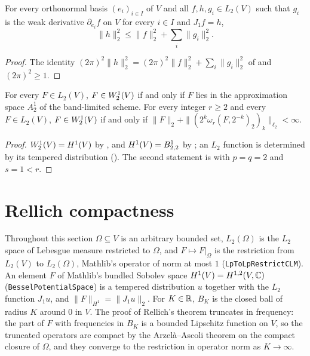 \begin{corollary}
\label{cor:weak-gradient-sobolev-norm}
\leanok
{}
For every orthonormal basis $(e_i)_{i \in I}$ of $V$ and all $f, h, g_i \in L_2(V)$ such that
$g_i$ is the weak derivative $\partial_{e_i} f$ on $V$ for every $i \in I$ and $J_1 f = h$,
\[
  \|h\|_2^2 \leq \|f\|_2^2 + \sum_i \|g_i\|_2^2 .
\]
\end{corollary}

\begin{proof}
\leanok
The identity $(2\pi)^2 \|h\|_2^2 = (2\pi)^2 \|f\|_2^2 + \sum_i \|g_i\|_2^2$ of
 and $(2\pi)^2 \geq 1$.
\end{proof}

\begin{theorem}[$\Sob{1}{2} = \Besov{1}{2}{2}$]
\label{thm:sobolev-one-two-besov}
\leanok
{}
For every $F \in L_2(V)$, $F \in W^{1}_{2}(V)$ if and only if $F$ lies in the approximation space
$A^1_2$ of the band-limited scheme. For every integer $r \geq 2$ and every $F \in L_2(V)$,
$F \in W^{1}_{2}(V)$ if and only if
$\|F\|_2 + \|(2^k \omega_r(F, 2^{-k})_2)_k\|_{\ell_2} < \infty$.
\end{theorem}

\begin{proof}
\leanok
$W^{1}_{2}(V) = H^1(V)$ by , and $H^1(V) = B^{1}_{2,2}$ by
; an $L_2$ function is determined by its tempered distribution
(). The second statement is  with
$p = q = 2$ and
$s = 1 < r$.
\end{proof}

\section{Rellich compactness}
\label{sec:rellich-compactness}

Throughout this section $\Omega \subseteq V$ is an arbitrary bounded set, $L_2(\Omega)$ is the
$L_2$ space of Lebesgue measure restricted to $\Omega$, and $F \mapsto F|_\Omega$ is the
restriction from $L_2(V)$ to $L_2(\Omega)$, Mathlib's operator of norm at most $1$
(\texttt{LpToLpRestrictCLM}). An element $F$ of Mathlib's bundled Sobolev space
$H^1(V) = H^{1,2}(V, \mathbb{C})$ (\texttt{BesselPotentialSpace}) is a tempered distribution $u$ together
with the $L_2$ function $J_1 u$, and $\|F\|_{H^1} = \|J_1 u\|_2$. For $K \in \mathbb{R}$, $B_K$ is the
closed ball of radius $K$ around $0$ in $V$. The proof of Rellich's theorem truncates in
frequency: the part of $F$ with frequencies in $B_K$ is a bounded Lipschitz function on $V$, so
the truncated operators are compact by the Arzel\`a--Ascoli theorem on the compact closure of
$\Omega$, and they converge to the restriction in operator norm as $K \to \infty$.

